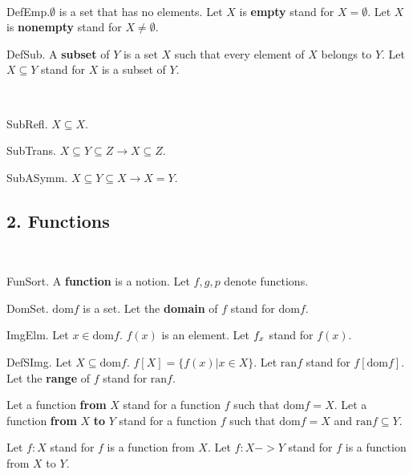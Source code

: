 \begin{definitions}\\
\begin{enumerate}

 DefEmp.$\emptyset$ is a set that has no elements.
Let $X$ is {\bf empty} stand for $X = \emptyset$.
Let $X$ is {\bf nonempty} stand for $X \neq \emptyset$.

 DefSub.  
A {\bf subset} of $Y$ is a set $X$ such that
every element of $X$ belongs to $Y$.
Let $X \subseteq Y$ stand for $X$ is a subset of $Y$.
\end{enumerate}
\end{definitions}


\begin{lemmas}\\
\begin{enumerate}

\lemmaitem SubRefl.
$X \subseteq X$.

\lemmaitem SubTrans.
$X \subseteq Y \subseteq Z  \rightarrow  X \subseteq Z$.
\end{enumerate}
\end{lemmas}

\begin{axiom} SubASymm.
$X \subseteq Y \subseteq X  \rightarrow  X = Y$.
\end{axiom}


\subsection{2. Functions}


\begin{signatures}\\
\begin{enumerate}

\signatureitem FunSort.
A {\bf function} is a notion.
Let $f,g,p$ denote functions.

\signatureitem DomSet.
$\text{dom} f$ is a set.
Let the {\bf domain} of $f$ stand for $\text{dom} f$.

\signatureitem ImgElm.
Let $x \in \text{dom} f$. $f(x)$ is an element.
Let ${f}_{x}$ stand for $f(x)$.
\end{enumerate}
\end{signatures}

\begin{definition} DefSImg. 
Let $X \subseteq \text{dom} f$. $f[X] = \{ f(x) | x \in X \}$.
Let $\text{ran} f$ stand for $f[\text{dom} f]$.
Let the {\bf range} of $f$ stand for $\text{ran} f$.

Let a function {\bf from} $X$ stand for a function $f$
such that $\text{dom} f = X$.
Let a function {\bf from} $X$ {\bf to} $Y$ stand 
for a function $f$ such that $\text{dom} f = X$
and $\text{ran} f \subseteq Y$.

Let $f : X$ stand for $f$ is a function from $X$.
Let $f : X -> Y$ stand for $f$ is a function from $X$ to $Y$.
\end{definition}

